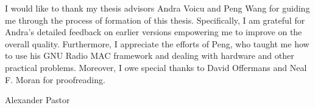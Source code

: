I would like to thank my thesis advisors Andra Voicu and Peng Wang for guiding me through the process of formation of this thesis. Specifically, I am grateful for Andra's detailed feedback on earlier versions empowering me to improve on the overall quality. Furthermore, I appreciate the efforts of Peng, who taught me how to use his GNU Radio MAC framework and dealing with hardware and other practical problems. 
Moreover, I owe special thanks to David Offermans and Neal F. Moran for proofreading.

\bigskip
\noindent Alexander Pastor